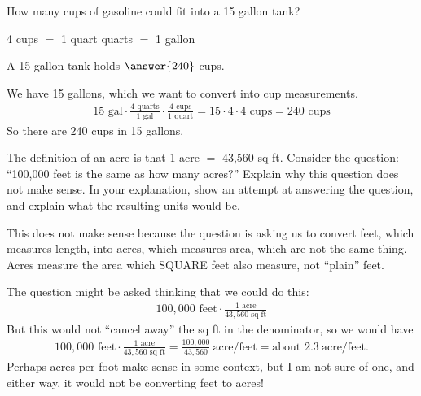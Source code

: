 \documentclass[12pt]{ximera}
\begin{document}
\begin{problem}
How many cups of gasoline could fit into a 15 gallon tank?

\hspace{1em} 4 cups $=$ 1 quart  quarts $=$ 1 gallon

A 15 gallon tank holds $\answer{240}$ cups.

\begin{freeResponse}
\end{freeResponse}

\begin{solution}
We have 15 gallons, which we want to convert into cup measurements.
\begin{gather*}
15\text{ gal} \cdot \frac{4\text{ quarts}}{1\text{ gal}} \cdot \frac{4\text{ cups}}{1\text{ quart}}
= 15 \cdot 4 \cdot 4\text{ cups} = 240\text{ cups}
\end{gather*}
So there are 240 cups in 15 gallons.
\end{solution}
\end{problem}

\begin{problem}
The definition of an acre is that 1 acre $=$ 43,560 sq ft. Consider the question:
``100,000 feet is the same as how many acres?'' Explain why this question does not make
sense. In your explanation, show an attempt at answering the question, and explain what
the resulting units would be.

\begin{freeResponse}
\end{freeResponse}

\begin{solution}
This does not make sense because the question is asking us to convert feet, which
measures length, into acres, which measures area, which are not the same thing. Acres
measure the area which SQUARE feet also measure, not ``plain'' feet.

The question might be asked thinking that we could do this:
\begin{gather*}
100{,}000\text{ feet} \cdot \frac{1\text{ acre}}{43{,}560\text{ sq ft}}
\end{gather*}
But this would not ``cancel away'' the sq ft in the denominator, so we would have
\begin{gather*}
100{,}000\text{ feet} \cdot \frac{1\text{ acre}}{43{,}560\text{ sq ft}}
= \frac{100{,}000}{43{,}560}\ \text{acre/feet} = \text{about } 2.3\ \text{acre/feet}.
\end{gather*}
Perhaps acres per foot make sense in some context, but I am not sure of one, and either
way, it would not be converting feet to acres!
\end{solution}
\end{problem}
\end{document}
